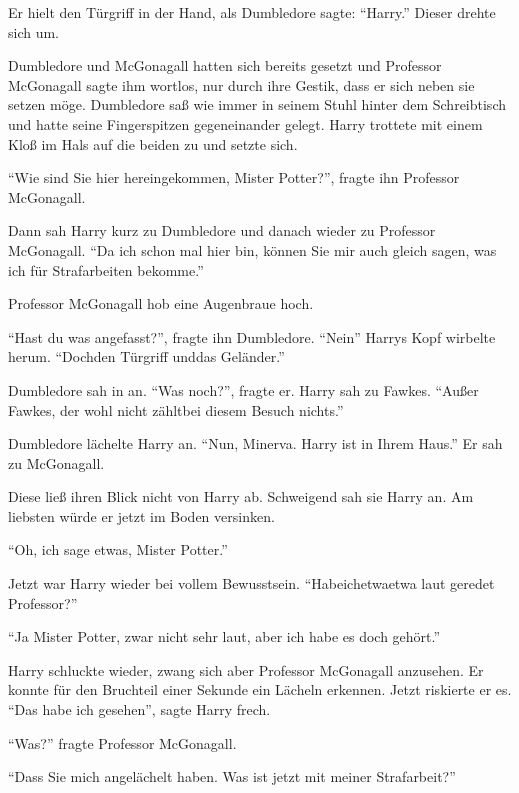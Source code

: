 Er hielt den Türgriff in der Hand, als Dumbledore sagte: \enquote{Harry.} Dieser drehte sich um.

Dumbledore und McGonagall hatten sich bereits gesetzt und Professor McGonagall sagte ihm wortlos, nur durch ihre Gestik, dass er sich neben sie setzen möge. Dumbledore saß wie immer in seinem Stuhl hinter dem Schreibtisch und hatte seine Fingerspitzen gegeneinander gelegt. Harry trottete mit einem Kloß im Hals auf die beiden zu und setzte sich.

\enquote{Wie sind Sie hier hereingekommen, Mister Potter?}, fragte ihn Professor McGonagall.

Dann sah Harry kurz zu Dumbledore und danach wieder zu Professor McGonagall. \enquote{Da ich schon mal hier bin, können Sie mir auch gleich sagen, was ich für Strafarbeiten bekomme.}

Professor McGonagall hob eine Augenbraue hoch.

\enquote{Hast du was angefasst?}, fragte ihn Dumbledore. \enquote{Nein\abs} Harrys Kopf wirbelte herum. \enquote{Doch\abs den Türgriff und\abs das Geländer.}

Dumbledore sah in an. \enquote{Was noch?}, fragte er. Harry sah zu Fawkes. \enquote{Außer Fawkes, der wohl nicht zählt\abs bei diesem Besuch nichts.}

Dumbledore lächelte Harry an. \enquote{Nun, Minerva. Harry ist in Ihrem Haus.} Er sah zu McGonagall.

Diese ließ ihren Blick nicht von Harry ab. Schweigend sah sie Harry an. Am liebsten würde er jetzt im Boden versinken.


\enquote{Oh, ich sage etwas, Mister Potter.}

Jetzt war Harry wieder bei vollem Bewusstsein. \enquote{Habe\abs ich\abs etwa\abs etwa laut geredet Professor?}

\enquote{Ja Mister Potter, zwar nicht sehr laut, aber ich habe es doch gehört.}

Harry schluckte wieder, zwang sich aber Professor McGonagall anzusehen. Er konnte für den Bruchteil einer Sekunde ein Lächeln erkennen. Jetzt riskierte er es. \enquote{Das habe ich gesehen}, sagte Harry frech.

\enquote{Was?} fragte Professor McGonagall.

\enquote{Dass Sie mich angelächelt haben. Was ist jetzt mit meiner Strafarbeit?}

